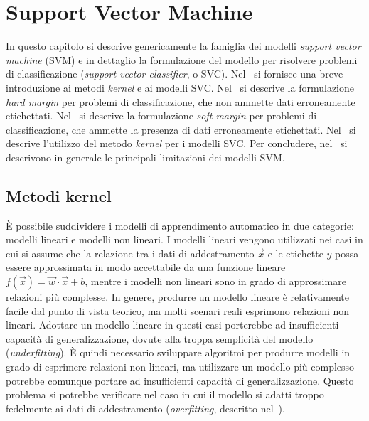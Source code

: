 \chapter{Support Vector Machine}\label{chap:SVC}
In questo capitolo si descrive genericamente la famiglia dei modelli \emph{support vector machine} (SVM) e in dettaglio la formulazione del modello per risolvere problemi di classificazione (\emph{support vector classifier}, o SVC). 
Nel~ si fornisce una breve introduzione ai metodi \emph{kernel} e ai modelli SVC. 
Nel~ si descrive la formulazione \emph{hard margin} per problemi di classificazione, che non ammette dati erroneamente etichettati.
Nel~ si descrive la formulazione \emph{soft margin} per problemi di classificazione, che ammette la presenza di dati erroneamente etichettati.
Nel~ si descrive l'utilizzo del metodo \emph{kernel} per i modelli SVC.
Per concludere, nel~ si descrivono in generale le principali limitazioni dei modelli SVM.

\section{Metodi kernel}\label{sec:kernel_methods}
\`E possibile suddividere i modelli di apprendimento automatico in due categorie: modelli lineari e modelli non lineari. 
I modelli lineari vengono utilizzati nei casi in cui si assume che la relazione tra i dati di addestramento $\Vec{x}$ e le etichette $y$ possa essere approssimata in modo accettabile da una funzione lineare $f(\Vec{x}) = \Vec{w}\cdot\Vec{x} + b$, mentre i modelli non lineari sono in grado di approssimare relazioni più complesse.
In genere, produrre un modello lineare è relativamente facile dal punto di vista teorico, ma molti scenari reali esprimono relazioni non lineari. 
Adottare un modello lineare in questi casi porterebbe ad insufficienti capacità di generalizzazione, dovute alla troppa semplicità del modello (\emph{underfitting}). 
\`E quindi necessario sviluppare algoritmi per produrre modelli in grado di esprimere relazioni non lineari, ma utilizzare un modello più complesso potrebbe comunque portare ad insufficienti capacità di generalizzazione. 
Questo problema si potrebbe verificare nel caso in cui il modello si adatti troppo fedelmente ai dati di addestramento (\emph{overfitting}, descritto nel~).

